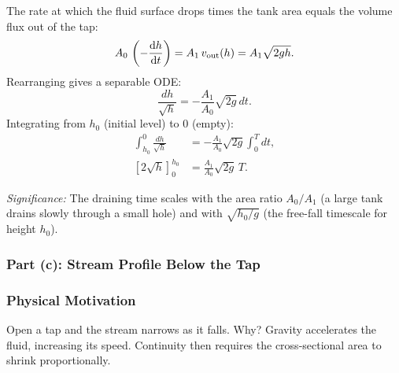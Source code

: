 \documentclass[../main.tex]{subfiles}
\begin{document}
The rate at which the fluid surface drops times the tank area equals the volume flux out of the tap:
\begin{equation}
  A_0\,\left(-\dv{h}{t}\right) = A_1\,v_{\mathrm{out}}(h) = A_1\sqrt{2gh}.
\end{equation}
Rearranging gives a separable ODE:
\begin{equation}
  \frac{dh}{\sqrt{h}} = -\frac{A_1}{A_0}\sqrt{2g}\,dt.
  \label{eq:lec13_ode_h}
\end{equation}
Integrating from $h_0$ (initial level) to $0$ (empty):
\begin{align}
  \int_{h_0}^{0}\frac{dh}{\sqrt{h}} &= -\frac{A_1}{A_0}\sqrt{2g}\int_0^T dt,\\
  \left[2\sqrt{h}\right]_0^{h_0} &= \frac{A_1}{A_0}\sqrt{2g}\,T.
\end{align}


\textit{Significance:} The draining time scales with the area ratio $A_0/A_1$ (a large tank drains slowly through a small hole) and with $\sqrt{h_0/g}$ (the free-fall timescale for height $h_0$).

\subsubsection{Part (c): Stream Profile Below the Tap}

\subsubsection*{Physical Motivation}
Open a tap and the stream narrows as it falls. Why? Gravity accelerates the fluid, increasing its speed. Continuity then requires the cross-sectional area to shrink proportionally.
\end{document}
